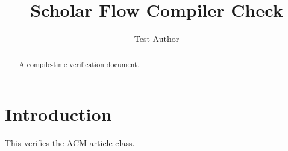 \documentclass[sigconf]{acmart}
\begin{document}
\title{Scholar Flow Compiler Check}
\author{Test Author}
\begin{abstract}A compile-time verification document.\end{abstract}
\maketitle
\section{Introduction}
This verifies the ACM article class.
\end{document}
